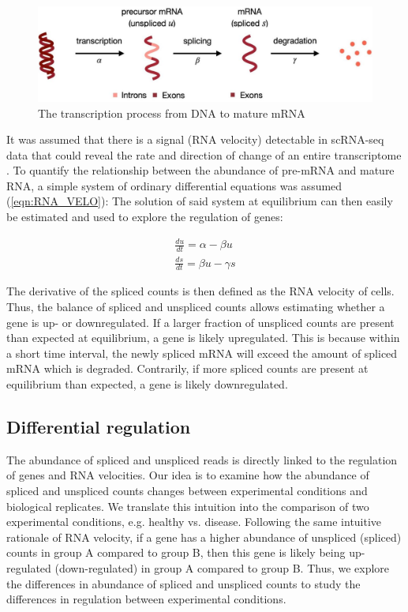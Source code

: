 \begin{figure}[!htb]
\begin{center}
\includegraphics{figure/regulation.jpg}
\end{center}
\caption{The transcription process from DNA to mature mRNA \citep{rna_velo_traj}}
\label{fig:RNA_VELO}
\end{figure}
\FloatBarrier

It was assumed that there is a signal (RNA velocity) detectable in scRNA-seq data that could reveal the rate and direction of change of an entire transcriptome \citep{rna_velo}. To quantify the relationship between the abundance of pre-mRNA and mature RNA, a simple system of ordinary differential equations was assumed (\ref{eqn:RNA_VELO}): The solution of said system at equilibrium can then easily be estimated and used to explore the regulation of genes:

\begin{equation}
\begin{array}{l}
\frac{du}{dt} = \alpha - \beta u \\
\frac{ds}{dt} = \beta u - \gamma s
\end{array}
\label{eqn:RNA_VELO}
\end{equation}

The derivative of the spliced counts is then defined as the RNA velocity of cells. Thus, the balance of spliced and unspliced counts allows estimating whether a gene is up- or downregulated. If a larger fraction of unspliced counts are present than expected at equilibrium, a gene is likely upregulated. This is because within a short time interval, the newly spliced mRNA will exceed the amount of spliced mRNA which is degraded. Contrarily, if more spliced counts are present at equilibrium than expected, a gene is likely downregulated.

\subsection{Differential regulation}
The abundance of spliced and unspliced reads is directly linked to the regulation of genes and RNA velocities. Our idea is to examine how the abundance of spliced and unspliced counts changes between experimental conditions and biological replicates. We translate this intuition into the comparison of two experimental conditions, e.g. healthy vs. disease. Following the same intuitive rationale of RNA velocity, if a gene has a higher abundance of unspliced (spliced) counts in group A  compared to group B, then this gene is likely being up-regulated (down-regulated) in group A compared to group B. Thus, we explore the differences in abundance of spliced and unspliced counts to study the differences in regulation between experimental conditions.

